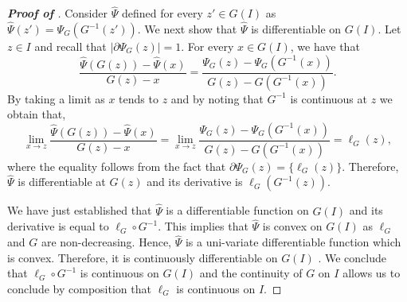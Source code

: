 \begin{proof}[\textbf{Proof of }]
Consider $\hat{\Psi}$ defined for every $z' \in G(I)$ as $\hat{\Psi}(z') = \Psi_{G}(G^{-1}(z'))$. We next show that $\hat{\Psi}$ is differentiable on $G(I)$. Let $z \in I$ and recall that $| \partial \Psi_{G}(z)| = 1$. For every $x \in G(I)$, we have that
    \begin{equation*}
         \frac{\hat{\Psi}(G(z)) - \hat{\Psi}(x)}{G(z)-x} = \frac{\Psi_{G}(z) - \Psi_{G}(G^{-1}(x))}{G(z)-G\left( G^{-1}(x) \right)}.
    \end{equation*}
By taking a limit as $x$ tends to $z$ and by noting that $G^{-1}$ is continuous at $z$ we obtain that,
    \begin{equation*}
        \lim_{x \to z} \frac{\hat{\Psi}(G(z)) - \hat{\Psi}(x)}{G(z)-x} = \lim_{x \to z} \frac{\Psi_{G}(z) - \Psi_{G}(G^{-1}(x))}{G(z)-G\left( G^{-1}(x) \right)} = \ell_{G}(z),
    \end{equation*}
where the equality follows from the fact that $\partial \Psi_{G}(z) = \{ \ell_{G}(z) \}$.  Therefore, $\hat{\Psi}$ is differentiable at $G(z)$ and its derivative is $\ell_{G}(G^{-1}(z))$. 

We have just established that $\hat{\Psi}$ is a differentiable function on $G(I)$ and its derivative is equal to $\ell_{G} \circ G^{-1}$. This implies that $\hat{\Psi}$ is convex on $G(I)$ as $\ell_{G}$ and $G$ are non-decreasing. Hence, $\hat{\Psi}$ is a uni-variate differentiable function  which is convex. Therefore, it is continuously differentiable on $G(I)$ \cite[Corollary 25.5.1]{rockafellar2007convex}. We conclude that $\ell_{G} \circ G^{-1}$ is continuous on $G(I)$ and the continuity of $G$ on $I$ allows us to conclude by composition that $\ell_{G}$ is continuous on $I$.
\end{proof}


